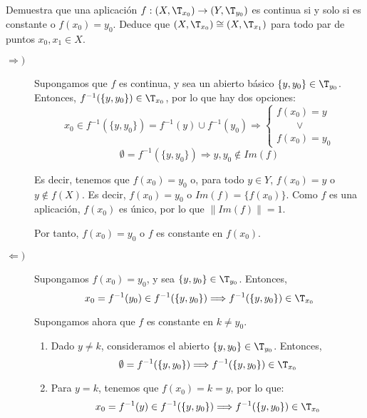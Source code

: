 \begin{ejercicio}
    Demuestra que una aplicación $f : (X, \T_{x_0}) \to (Y, \T_{y_0})$ es continua si y solo si es constante o $f(x_0) = y_0$. Deduce que $(X, \T_{x_0}) \cong (X, \T_{x_1})$ para todo par de puntos $x_0, x_1 \in X$.

    \begin{description}
        \item[$\Longrightarrow)$] Supongamos que $f$ es continua, y sea un abierto básico $\{y,y_0\}\in \T_{y_0}$. Entonces, $f^{-1}(\{y,y_0\})\in \T_{x_0}$, por lo que hay dos opciones:
        \begin{equation*}
            x_0\in f^{-1}(\{y,y_0\}) = f^{-1}(y) \cup f^{-1}(y_0) \Longrightarrow
            \left\{
            \begin{array}{l}
                f(x_0) = y \\
                \qquad \lor \\
                f(x_0)=y_0
            \end{array}
            \right.
        \end{equation*}
        \begin{equation*}
            \emptyset = f^{-1}(\{y,y_0\})  \Longrightarrow
            y,y_0\notin Im(f)
        \end{equation*}

        Es decir, tenemos que $f(x_0)=y_0$ o, para todo $y\in Y$, $f(x_0)=y$ o $y\notin f(X)$. Es decir, $f(x_0)=y_0$ o $Im(f)=\{f(x_0)\}$. Como $f$ es una aplicación, $f(x_0)$ es único, por lo que $\|Im(f)\|=1$.

        Por tanto, $f(x_0)=y_0$ o $f$ es constante en $f(x_0)$.

        \item[$\Longleftarrow)$] Supongamos $f(x_0)=y_0$, y sea $\{y,y_0\}\in \T_{y_0}$. Entonces,
        \begin{equation*}
            x_0=f^{-1}(y_0)\in f^{-1}(\{y,y_0\}) \Longrightarrow f^{-1}(\{y,y_0\})\in \T_{x_0}
        \end{equation*}

        Supongamos ahora que $f$ es constante en $k\neq y_0$.
        \begin{enumerate}
            \item Dado $y\neq k$, consideramos el abierto $\{y,y_0\}\in \T_{y_0}$. Entonces,
            \begin{equation*}
                \emptyset = f^{-1}(\{y,y_0\}) \Longrightarrow f^{-1}(\{y,y_0\})\in \T_{x_0}
            \end{equation*}
            \item Para $y=k$, tenemos que $f(x_0)=k=y$, por lo que:
            \begin{equation*}
                x_0=f^{-1}(y)\in f^{-1}(\{y,y_0\}) \Longrightarrow f^{-1}(\{y,y_0\})\in \T_{x_0}
            \end{equation*}
        \end{enumerate}
    \end{description}


\end{ejercicio}
